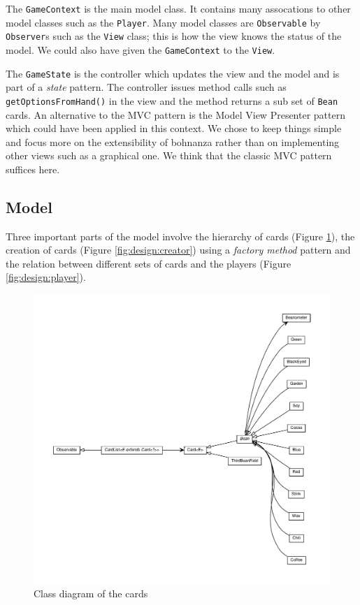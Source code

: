 The \texttt{GameContext} is the main model class. It contains many assocations to other model classes such as the \texttt{Player}. Many
model classes are \texttt{Observable} by \texttt{Observer}s such as the \texttt{View} class; this is how the view knows the status of the
model. We could also have given the \texttt{GameContext} to the \texttt{View}.

The \texttt{GameState} is the controller which updates the view and the model and is part of a \emph{state} pattern. The controller issues
method calls such as \texttt{getOptionsFromHand()} in the view and the method returns a sub set of \texttt{Bean} cards. An alternative to
the MVC pattern is the Model View Presenter pattern which could have been applied in this context. We chose to keep things simple and focus more on the
extensibility of bohnanza rather than on implementing other views such as a graphical one. We think that the classic MVC pattern suffices
here. 
 
\subsection{Model}
Three important parts of the model involve the hierarchy of cards (Figure \ref{fig:design:cards}),
the creation of cards (Figure \ref{fig:design:creator}) using a \emph{factory method} pattern and
the relation between different sets of cards and the players (Figure \ref{fig:design:player}). 

 \begin{figure}[h!]
    \includegraphics[width=\textwidth]{../umlgraph/CardGraph}
    \caption{Class diagram of the cards}
    \label{fig:design:cards}
\end{figure}


